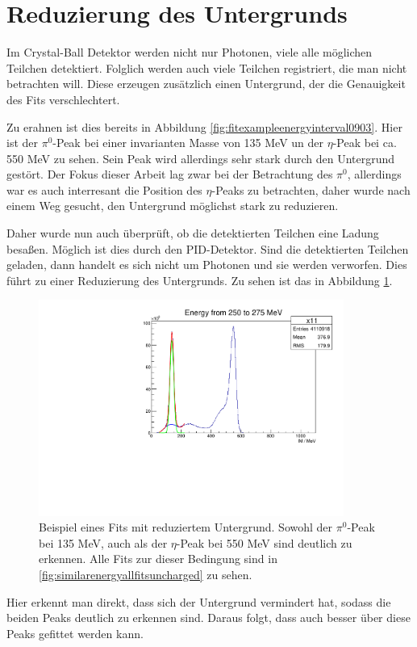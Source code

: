 \documentclass[a4paper,11pt,oneside,final,german,openbib,pdftex]{scrbook}
\begin{document}
{\section{Reduzierung des Untergrunds}

Im Crystal-Ball Detektor werden nicht nur Photonen, viele alle m\"oglichen Teilchen detektiert. Folglich werden auch viele Teilchen registriert, die man nicht betrachten will. Diese erzeugen zus\"atzlich einen Untergrund, der die Genauigkeit des Fits verschlechtert.

Zu erahnen ist dies bereits in Abbildung \ref{fig:fitexampleenergyinterval0903}. Hier ist der $\pi^0$-Peak bei einer invarianten Masse von 135 MeV un der $\eta$-Peak bei ca. 550 MeV zu sehen. Sein Peak wird allerdings sehr stark durch den Untergrund gest\"ort. Der Fokus dieser Arbeit lag zwar bei der Betrachtung des $\pi^0$, allerdings war es auch interresant die Position des $\eta$-Peaks zu betrachten, daher wurde nach einem Weg gesucht, den Untergrund m\"oglichst stark zu reduzieren. 

Daher wurde nun auch \"uberpr\"uft, ob die detektierten Teilchen eine Ladung besa{\ss}en. M\"oglich ist dies durch den PID-Detektor. Sind die detektierten Teilchen geladen, dann handelt es sich nicht um Photonen und sie werden verworfen. Dies f\"uhrt zu einer Reduzierung des Untergrunds. Zu sehen ist das in Abbildung \ref{fig:Reduzierter-Untergrund-Fit}.


\begin{figure}[h!]
	\begin{center}
		\includegraphics[width=100mm]{NewCalib/Strahlzeit2014/20171904RealUnchargedFitExample}
	\end{center}
\caption[Strahlzeit: Beispiel eines Fits mit reduziertem Untergrund]{Beispiel eines Fits mit reduziertem Untergrund. Sowohl der $\pi^0$-Peak bei 135 MeV, auch als der $\eta$-Peak bei 550 MeV sind deutlich zu erkennen. Alle Fits zur dieser Bedingung sind in \ref{fig:similarenergyallfitsuncharged} zu sehen.}
\label{fig:Reduzierter-Untergrund-Fit}
\end{figure}
 Hier erkennt man direkt, dass sich der Untergrund vermindert hat, sodass die beiden Peaks deutlich zu erkennen sind. Daraus folgt, dass auch besser \"uber diese Peaks gefittet werden kann.


}
\end{document}
